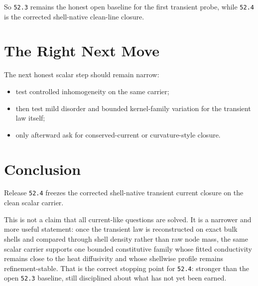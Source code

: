 \documentclass[11pt]{article}
\begin{document}
So \texttt{52.3} remains the honest open baseline for the first transient probe, while \texttt{52.4} is the corrected shell-native clean-line closure.

\section{The Right Next Move}

The next honest scalar step should remain narrow:
\begin{itemize}
\item test controlled inhomogeneity on the same carrier;
\item then test mild disorder and bounded kernel-family variation for the transient law itself;
\item only afterward ask for conserved-current or curvature-style closure.
\end{itemize}

\section{Conclusion}

Release \texttt{52.4} freezes the corrected shell-native transient current closure on the clean scalar carrier.

This is not a claim that all current-like questions are solved. It is a narrower and more useful statement: once the transient law is reconstructed on exact bulk shells and compared through shell density rather than raw node mass, the same scalar carrier supports one bounded constitutive family whose fitted conductivity remains close to the heat diffusivity and whose shellwise profile remains refinement-stable. That is the correct stopping point for \texttt{52.4}: stronger than the open \texttt{52.3} baseline, still disciplined about what has not yet been earned.
\end{document}
